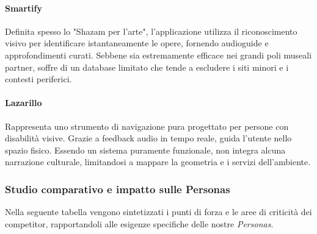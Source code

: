 \paragraph{Smartify} Definita spesso lo "Shazam per l'arte", l'applicazione utilizza il riconoscimento visivo per identificare istantaneamente le opere, fornendo audioguide e approfondimenti curati. Sebbene sia estremamente efficace nei grandi poli museali partner, soffre di un database limitato che tende a escludere i siti minori e i contesti periferici.

\paragraph{Lazarillo} Rappresenta uno strumento di navigazione pura progettato per persone con disabilità visive. Grazie a feedback audio in tempo reale, guida l'utente nello spazio fisico. Essendo un sistema puramente funzionale, non integra alcuna narrazione culturale, limitandosi a mappare la geometria e i servizi dell'ambiente.

\newpage
\subsubsection{Studio comparativo e impatto sulle Personas}
Nella seguente tabella vengono sintetizzati i punti di forza e le aree di criticità dei competitor, rapportandoli alle esigenze specifiche delle nostre \textit{Personas}.

